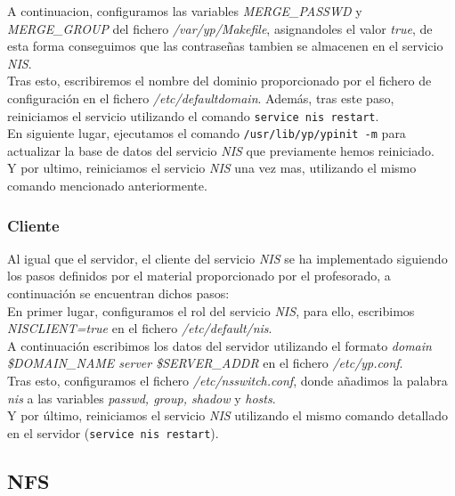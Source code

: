 \documentclass[12pt,a4paper, spanish]{article}
\begin{document}
A continuacion, configuramos las variables \textit{MERGE\_PASSWD} y \textit{MERGE\_GROUP} del fichero \textit{/var/yp/Makefile}, asignandoles el valor \textit{true}, de esta forma conseguimos que las contraseñas tambien se almacenen en el servicio \textit{NIS}.\\

Tras esto, escribiremos el nombre del dominio proporcionado por el fichero de configuración en el fichero \textit{/etc/defaultdomain}. Además, tras este paso, reiniciamos el servicio utilizando el comando \texttt{service nis restart}.\\

En siguiente lugar, ejecutamos el comando \texttt{/usr/lib/yp/ypinit -m} para actualizar la base de datos del servicio \textit{NIS} que previamente hemos reiniciado.\\

Y por ultimo, reiniciamos el servicio \textit{NIS} una vez mas, utilizando el mismo comando mencionado anteriormente.\\

\subsubsection{Cliente}
\noindent Al igual que el servidor, el cliente del servicio \textit{NIS} se ha implementado siguiendo los pasos definidos por el material proporcionado por el profesorado, a continuación se encuentran dichos pasos:\\

En primer lugar, configuramos el rol del servicio \textit{NIS}, para ello, escribimos \textit{NISCLIENT=true} en el fichero \textit{/etc/default/nis}.\\

A continuación escribimos los datos del servidor utilizando el formato \textit{domain \$DOMAIN\_NAME server \$SERVER\_ADDR} en el fichero \textit{/etc/yp.conf}.\\

Tras esto, configuramos el fichero \textit{/etc/nsswitch.conf}, donde añadimos la palabra \textit{nis} a las variables \textit{passwd, group, shadow} y \textit{hosts}.\\

Y por último, reiniciamos el servicio \textit{NIS} utilizando el mismo comando detallado en el servidor (\texttt{service nis restart}).\\


\subsection{NFS}
\end{document}
